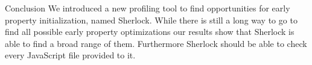 \documentclass[a1paper,portrait,fontscale=0.418]{baposter}
\begin{document}
\begin{poster}
\begin{posterbox}[name=conclusion,span=2,column=1,below=results1]{Conclusion} 
We introduced a new profiling tool to find opportunities for early property initialization, named Sherlock. While there is still a long way to go to find all possible early property optimizations our results show that Sherlock is able to find a broad range of them. Furthermore Sherlock should be able to check every JavaScript file provided to it. 

%
%
%
%
%
%
%
%
%
\end{posterbox}


\end{poster}
\end{document}
